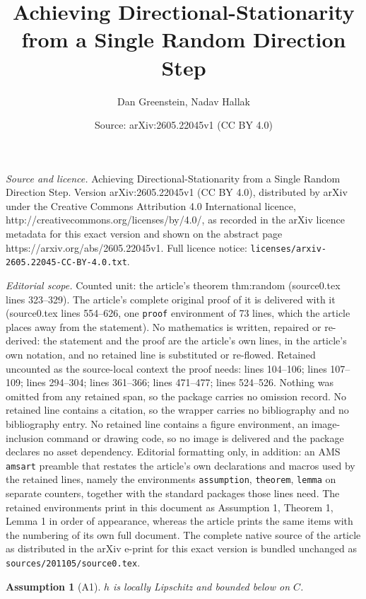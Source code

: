 \documentclass[10pt,a4paper]{amsart}
\title{Achieving Directional-Stationarity from a Single Random Direction Step}
\author{Dan Greenstein, Nadav Hallak}
\date{Source: arXiv:2605.22045v1 (CC BY 4.0)}
\newtheorem{assumption}{Assumption}
\begin{document}
\maketitle

\noindent\emph{Source and licence.} Achieving Directional-Stationarity from a Single Random Direction Step. Version arXiv:2605.22045v1 (CC BY 4.0), distributed by arXiv under the Creative Commons Attribution 4.0 International licence, http://creativecommons.org/licenses/by/4.0/, as recorded in the arXiv licence metadata for this exact version and shown on the abstract page https://arxiv.org/abs/2605.22045v1. Full licence notice: \texttt{licenses/arxiv-2605.22045-CC-BY-4.0.txt}.\par\smallskip

\noindent\textit{Editorial scope.} Counted unit: the article's theorem thm:random (source0.tex lines 323--329). The article's complete original proof of it is delivered with it (source0.tex lines 554--626, one \texttt{proof} environment of 73 lines, which the article places away from the statement). No mathematics is written, repaired or re-derived: the statement and the proof are the article's own lines, in the article's own notation, and no retained line is substituted or re-flowed.  Retained uncounted as the source-local context the proof needs: lines 104--106; lines 107--109; lines 294--304; lines 361--366; lines 471--477; lines 524--526.  Nothing was omitted from any retained span, so the package carries no omission record.  No retained line contains a citation, so the wrapper carries no bibliography and no bibliography entry.  No retained line contains a figure environment, an image-inclusion command or drawing code, so no image is delivered and the package declares no asset dependency.  Editorial formatting only, in addition: an AMS \texttt{amsart} preamble that restates the article's own declarations and macros used by the retained lines, namely the environments \texttt{assumption}, \texttt{theorem}, \texttt{lemma} on separate counters, together with the standard packages those lines need.  The retained environments print in this document as Assumption 1, Theorem 1, Lemma 1 in order of appearance, whereas the article prints the same items with the numbering of its own full document.  The complete native source of the article as distributed in the arXiv e-print for this exact version is bundled unchanged as \texttt{sources/201105/source0.tex}.
\begin{assumption}[A1]\label{ass:A1}
$h$ is locally Lipschitz and bounded below on $C$.
\end{assumption}
\end{document}
